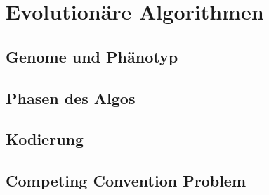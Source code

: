 \section{Evolutionäre Algorithmen}
\subsection{Genome und Phänotyp}
\subsection{Phasen des Algos}
\subsection{Kodierung}
\subsection{Competing Convention Problem}
\label{subsec:competing_convention_problem}